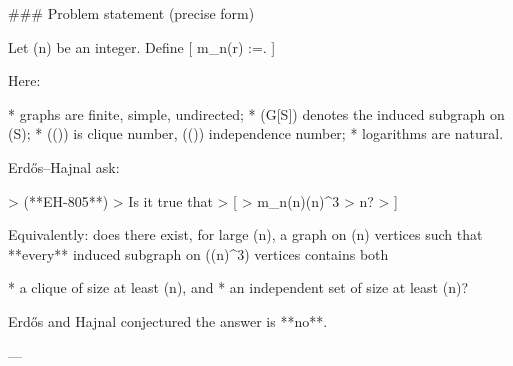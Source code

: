 ### Problem statement (precise form)

Let (n) be an integer. Define
[
m_n(r)
:=\min{}.
]

Here:

* graphs are finite, simple, undirected;
* (G[S]) denotes the induced subgraph on (S);
* (\omega(\cdot)) is clique number, (\alpha(\cdot)) independence number;
* logarithms are natural.

Erdős–Hajnal ask:

> (**EH-805**)
> Is it true that
> [
> m_n(\lceil\log n\rceil)\le (\log n)^3
> \quad{}n?
> ]

Equivalently: does there exist, for large (n), a graph on (n) vertices such that **every** induced subgraph on ((\log n)^3) vertices contains both

* a clique of size at least (\log n), and
* an independent set of size at least (\log n)?

Erdős and Hajnal conjectured the answer is **no**.

---
